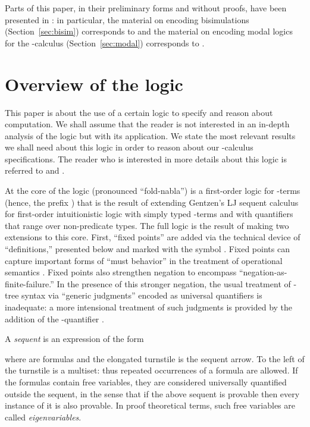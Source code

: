 \documentclass{acmtrans2m}
\begin{document}
Parts of this paper, in their preliminary forms and without proofs,
have been presented in \cite{tiu04fguc,tiu05concur}: in particular,
the material on encoding bisimulations (Section~\ref{sec:bisim})
corresponds to \cite{tiu04fguc} and the material on encoding modal
logics for the -calculus (Section~\ref{sec:modal}) corresponds to
\cite{tiu05concur}.



\section{Overview of the logic}
\label{sec:foldn}

This paper is about the use of a certain logic to specify and reason
about computation.  We shall assume that the reader is not interested
in an in-depth analysis of the logic but with its application.  We
state the most relevant results we shall need about this logic in
order to reason about our -calculus specifications.  The reader
who is interested in more details about this logic is referred to
\cite{tiu04phd} and \cite{miller05tocl}.


At the core of the logic  (pronounced ``fold-nabla'') is a
first-order logic for -terms (hence, the prefix ) that
is the result of extending Gentzen's LJ sequent calculus for
first-order intuitionistic logic \cite{gentzen35} with simply typed
-terms and with quantifiers that range over non-predicate
types.
The full logic is the result of making two extensions to this core.
First, ``fixed points'' are added via the technical
device of ``definitions,'' presented below and marked with the symbol
.  Fixed points can capture important forms of ``must
behavior'' in the treatment of operational semantics
\cite{mcdowell00tcs,mcdowell03tcs}.  Fixed points also strengthen
negation to encompass ``negation-as-finite-failure.''  In the presence
of this stronger negation, the usual treatment of -tree
syntax via ``generic judgments'' encoded as universal quantifiers is inadequate:
a more intensional
treatment of such judgments is provided by the addition of the
-quantifier \cite{miller05tocl}.

A {\em sequent} is an expression of the form

where  are formulas and the elongated turnstile
 is the sequent arrow.
To the left of the turnstile is a multiset: thus
repeated occurrences of a formula are allowed.  If the formulas  contain free variables, they are considered universally
quantified outside the sequent, in the sense that if the above sequent
is provable then every instance of it is also provable.  In proof
theoretical terms, such free variables are called {\em eigenvariables}.
\end{document}
